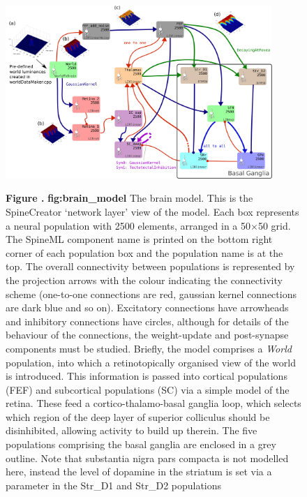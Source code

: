 \documentclass{frontiersSCNS}
\begin{document}
\begin{figure}[htb!]
\begin{center}
\includegraphics[width=0.9\textwidth]{./figures/Brain_Model.png}
\end{center}
\textbf{\label{fig:brain_model} Figure .}
{ \textbf{fig:brain\_model}  The brain model. This is the SpineCreator `network layer' view of the model. Each box represents a neural population with 2500 elements, arranged in a 50$\times$50 grid. The SpineML component name is printed on the bottom right corner of each population box and the population name is at the top. The overall connectivity between populations is represented by the projection arrows with the colour indicating the connectivity scheme (one-to-one connections are red, gaussian kernel connections are dark blue and so on). Excitatory connections have arrowheads and inhibitory connections have circles, although for details of the behaviour of the connections, the weight-update and post-synapse components must be studied. Briefly, the model comprises a \emph{World} population, into which a retinotopically organised view of the world is introduced. This information is passed into cortical populations (FEF) and subcortical populations (SC) via a simple model of the retina. These feed a cortico-thalamo-basal ganglia loop, which selects which region of the deep layer of superior colliculus should be disinhibited, allowing activity to build up therein. The five populations comprising the basal ganglia are enclosed in a grey outline. Note that substantia nigra pars compacta is not modelled here, instead the level of dopamine in the striatum is set via a parameter in the Str\_D1 and Str\_D2 populations}
\end{figure}
\end{document}
